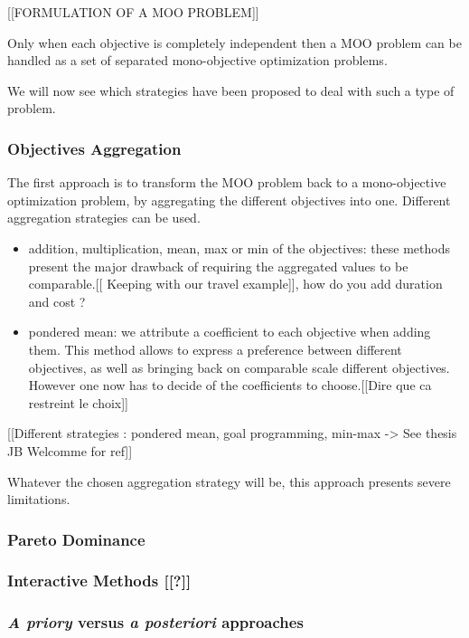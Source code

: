 [[FORMULATION OF A MOO PROBLEM]]

Only when each objective is completely independent then a MOO problem can be handled as a set of separated mono-objective optimization problems.

We will now see which strategies have been proposed to deal with such a type of problem.

\subsubsection{Objectives Aggregation}

The first approach is to transform the MOO problem back to a mono-objective optimization problem, by aggregating the different objectives into one. Different aggregation strategies can be used.

\begin{itemize}
\item addition, multiplication, mean, max or min of the objectives: these methods present  the major drawback of requiring the aggregated values to be comparable.[[ Keeping with our travel example]], how do you add duration and cost ?
\item pondered mean: we attribute a coefficient to each objective when adding them. This method allows to express a preference between different objectives, as well as bringing back on comparable scale different objectives. However one now has to decide of the coefficients to choose.[[Dire que ca restreint  le choix]]
\end{itemize}

[[Different strategies : pondered mean, goal programming, min-max -> See thesis JB Welcomme for ref]]

Whatever the chosen aggregation strategy will be, this approach presents severe limitations. 

\subsubsection{Pareto Dominance}

\subsubsection{Interactive Methods [[?]]}

\subsubsection{\emph{A priory} versus \emph{a posteriori} approaches}

